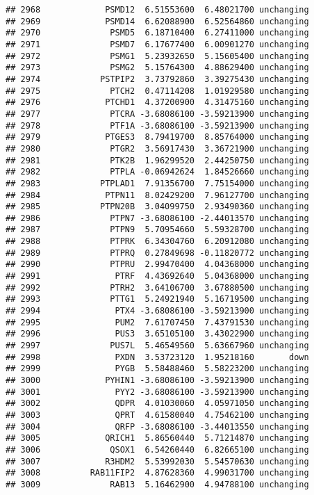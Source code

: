 \documentclass[]{article}
\begin{document}
\begin{verbatim}
## 2968             PSMD12  6.51553600  6.48021700 unchanging
## 2969             PSMD14  6.62088900  6.52564860 unchanging
## 2970              PSMD5  6.18710400  6.27411000 unchanging
## 2971              PSMD7  6.17677400  6.00901270 unchanging
## 2972              PSMG1  5.23932650  5.15605400 unchanging
## 2973              PSMG2  5.15764300  4.88629400 unchanging
## 2974            PSTPIP2  3.73792860  3.39275430 unchanging
## 2975              PTCH2  0.47114208  1.01929580 unchanging
## 2976             PTCHD1  4.37200900  4.31475160 unchanging
## 2977              PTCRA -3.68086100 -3.59213900 unchanging
## 2978              PTF1A -3.68086100 -3.59213900 unchanging
## 2979             PTGES3  8.79419700  8.85764000 unchanging
## 2980              PTGR2  3.56917430  3.36721900 unchanging
## 2981              PTK2B  1.96299520  2.44250750 unchanging
## 2982              PTPLA -0.06942624  1.84526660 unchanging
## 2983            PTPLAD1  7.91356700  7.75154000 unchanging
## 2984             PTPN11  8.02429200  7.96127700 unchanging
## 2985            PTPN20B  3.04099750  2.93490360 unchanging
## 2986              PTPN7 -3.68086100 -2.44013570 unchanging
## 2987              PTPN9  5.70954660  5.59328700 unchanging
## 2988              PTPRK  6.34304760  6.20912080 unchanging
## 2989              PTPRQ  0.27849698 -0.11820772 unchanging
## 2990              PTPRU  2.99470400  4.04368000 unchanging
## 2991               PTRF  4.43692640  5.04368000 unchanging
## 2992              PTRH2  3.64106700  3.67880500 unchanging
## 2993              PTTG1  5.24921940  5.16719500 unchanging
## 2994               PTX4 -3.68086100 -3.59213900 unchanging
## 2995               PUM2  7.61707450  7.43791530 unchanging
## 2996               PUS3  3.65105100  3.43022900 unchanging
## 2997              PUS7L  5.46549560  5.63667960 unchanging
## 2998               PXDN  3.53723120  1.95218160       down
## 2999               PYGB  5.58488460  5.58223200 unchanging
## 3000             PYHIN1 -3.68086100 -3.59213900 unchanging
## 3001               PYY2 -3.68086100 -3.59213900 unchanging
## 3002               QDPR  4.01030060  4.05971050 unchanging
## 3003               QPRT  4.61580040  4.75462100 unchanging
## 3004               QRFP -3.68086100 -3.44013550 unchanging
## 3005             QRICH1  5.86560440  5.71214870 unchanging
## 3006              QSOX1  6.54260440  6.82665100 unchanging
## 3007             R3HDM2  5.53992030  5.54570630 unchanging
## 3008          RAB11FIP2  4.87628360  4.99031700 unchanging
## 3009              RAB13  5.16462900  4.94788100 unchanging

\end{verbatim}
\end{document}
